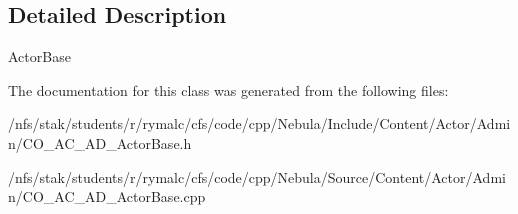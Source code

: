 \subsection{Detailed Description}
ActorBase 

The documentation for this class was generated from the following files:\begin{DoxyCompactItemize}
\item 
/nfs/stak/students/r/rymalc/cfs/code/cpp/Nebula/Include/Content/Actor/Admin/CO\_\-AC\_\-AD\_\-ActorBase.h\item 
/nfs/stak/students/r/rymalc/cfs/code/cpp/Nebula/Source/Content/Actor/Admin/CO\_\-AC\_\-AD\_\-ActorBase.cpp\end{DoxyCompactItemize}
